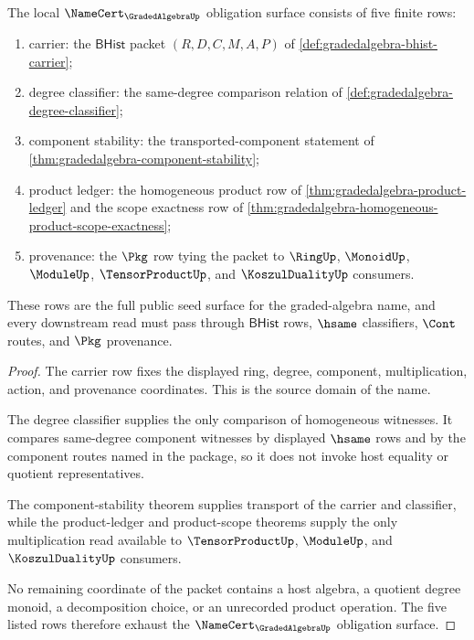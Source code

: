 \begin{theorem}
\label{thm:gradedalgebra-namecert-obligation-surface}
The local $\NameCert_{\GradedAlgebraUp}$ obligation surface consists of five finite rows:
\begin{enumerate}
\item carrier: the $\mathsf{BHist}$ packet $(R,D,C,M,A,P)$ of \autoref{def:gradedalgebra-bhist-carrier};
\item degree classifier: the same-degree comparison relation of \autoref{def:gradedalgebra-degree-classifier};
\item component stability: the transported-component statement of \autoref{thm:gradedalgebra-component-stability};
\item product ledger: the homogeneous product row of \autoref{thm:gradedalgebra-product-ledger} and the scope exactness row of \autoref{thm:gradedalgebra-homogeneous-product-scope-exactness};
\item provenance: the $\Pkg$ row tying the packet to $\RingUp$, $\MonoidUp$, $\ModuleUp$, $\TensorProductUp$, and $\KoszulDualityUp$ consumers.
\end{enumerate}
These rows are the full public seed surface for the graded-algebra name, and every downstream read must pass through $\mathsf{BHist}$ rows, $\hsame$ classifiers, $\Cont$ routes, and $\Pkg$ provenance.
\end{theorem}
\begin{proof}
The carrier row fixes the displayed ring, degree, component, multiplication, action, and provenance coordinates. This is the source domain of the name.

The degree classifier supplies the only comparison of homogeneous witnesses. It compares same-degree component witnesses by displayed $\hsame$ rows and by the component routes named in the package, so it does not invoke host equality or quotient representatives.

The component-stability theorem supplies transport of the carrier and classifier, while the product-ledger and product-scope theorems supply the only multiplication read available to $\TensorProductUp$, $\ModuleUp$, and $\KoszulDualityUp$ consumers.

No remaining coordinate of the packet contains a host algebra, a quotient degree monoid, a decomposition choice, or an unrecorded product operation. The five listed rows therefore exhaust the $\NameCert_{\GradedAlgebraUp}$ obligation surface.
\end{proof}

